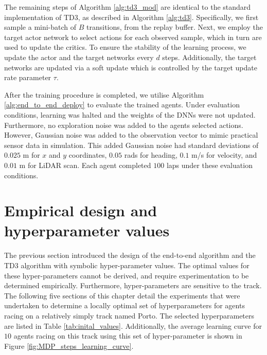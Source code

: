 The remaining steps of Algorithm \ref{alg:td3_mod} are identical to the standard implementation of TD3, as described in Algorithm \ref{alg:td3}. 
Specifically, we first sample a mini-batch of $B$ transitions, from the replay buffer.
Next, we employ the target actor network to select actions for each observed sample, which in turn are used to update the critics. 
To ensure the stability of the learning process, we update the actor and the target networks every $d$ steps. 
Additionally, the target networks are updated via a soft update which is controlled by the target update rate parameter $\tau$. 

After the training procedure is completed, we utilise Algorithm \ref{alg:end_to_end_deploy} to evaluate the trained agents.
Under evaluation conditions, learning was halted and the weights of the DNNs were not updated.
Furthermore, no exploration noise was added to the agents selected actions. 
However, Gaussian noise was added to the observation vector to mimic practical sensor data in simulation. 
This added Gaussian noise had standard deviations of $0.025$ m for $x$ and $y$ coordinates, $0.05$ rads for heading, $0.1$ m/s for velocity, and $0.01$ m for LiDAR scan. 
Each agent completed $100$ laps under these evaluation conditions.







\section{Empirical design and hyperparameter values}\label{sec:ete_empirical_design}

The previous section introduced the design of the end-to-end algorithm and the TD3 algorithm with symbolic hyper-parameter values. 
The optimal values for these hyper-parameters cannot be derived, and require experimentation to be determined empirically. 
Furthermore, hyper-parameters are sensitive to the track.
The following five sections of this chapter detail the experiments that were undertaken to determine a locally optimal set of hyperparameters for agents racing on a relatively simply track named Porto.
The selected hyperparameters are listed in Table \ref{tab:inital_values}.
Additionally, the average learning curve for $10$ agents racing on this track using this set of hyper-parameter is shown in Figure \ref{fig:MDP_steps_learning_curve}.

